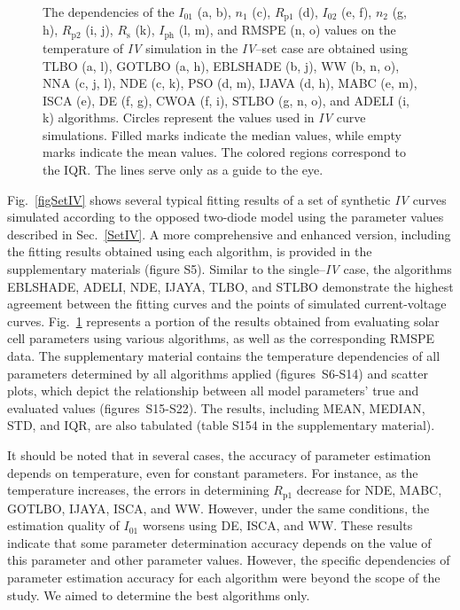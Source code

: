 \documentclass[a4paper,fleqn]{cas-sc}
\begin{document}
\begin{figure}[]
	  \caption{
The dependencies of the $I_{01}$ (a, b), $n_1$ (c), $R_\mathrm{p1}$ (d), $I_{02}$ (e, f),
$n_2$ (g, h), $R_\mathrm{p2}$ (i, j), $R_\mathrm{s}$ (k), $I_\mathrm{ph}$ (l, m), and RMSPE (n, o)
values on the temperature of \emph{IV} simulation in the \emph{IV}--set case are obtained using
TLBO (a, l), GOTLBO (a, h), EBLSHADE (b, j), WW (b, n, o), NNA (c, j, l), NDE (c, k), PSO (d, m), IJAVA (d, h),
MABC (e, m), ISCA (e), DE (f, g), CWOA (f, i), STLBO (g, n, o), and ADELI (i, k) algorithms.
Circles represent the values used in \emph{IV} curve simulations.
Filled marks indicate the median values, while empty marks indicate the mean values.
The colored regions correspond to the IQR.
The lines serve only as a guide to the eye.
               }\label{figTDepIVset}
\end{figure}

Fig.~\ref{figSetIV} shows several typical fitting results of a set of synthetic \emph{IV} curves
simulated according to the opposed two-diode model using the parameter values described in Sec.~\ref{SetIV}.
A more comprehensive and enhanced version, including the fitting results obtained using each algorithm,
is provided in the supplementary materials (figure S5).
Similar to the single--\emph{IV} case, the algorithms EBLSHADE, ADELI, NDE, IJAYA, TLBO, and STLBO
demonstrate the highest agreement between the fitting curves and the points of simulated current-voltage curves.
Fig.~\ref{figTDepIVset} represents a portion of the results obtained from evaluating solar cell parameters using various algorithms,
as well as the corresponding RMSPE data.
The supplementary material contains the temperature dependencies of all
parameters determined by all algorithms applied (figures~S6-S14) and scatter plots,
which depict the relationship between all model parameters' true and evaluated values (figures~S15-S22).
The results, including MEAN, MEDIAN, STD, and IQR, are also tabulated (table S154 in the supplementary material).


It should be noted that in several cases, the accuracy of parameter estimation depends on temperature, even for constant parameters.
For instance, as the temperature increases,
the errors in determining $R_\mathrm{p1}$ decrease for NDE, MABC, GOTLBO, IJAYA, ISCA, and WW.
However, under the same conditions, the estimation quality of $I_{01}$ worsens using DE, ISCA, and WW.
These results indicate that some parameter determination accuracy
depends on the value of this parameter and other parameter values.
However, the specific dependencies of parameter estimation accuracy
for each algorithm were beyond the scope of the study.
We aimed to determine the best algorithms only.
\end{document}
